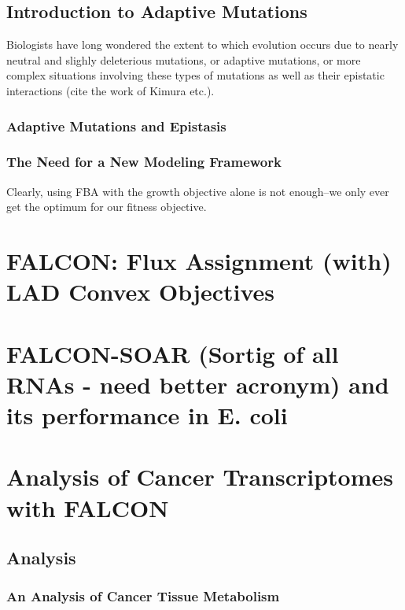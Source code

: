 \documentclass[phd,tocprelim]{cornell}
\newcommand*{\commonDir}{../common/}   %
\begin{document}
\section{Introduction to Adaptive Mutations}
Biologists have long wondered the extent to which evolution occurs due to nearly neutral 
and slighly deleterious mutations, or adaptive mutations, or more complex situations involving
these types of mutations as well as their epistatic interactions (cite the work of Kimura etc.).
 
\subsection{Adaptive Mutations and Epistasis}

\subsection{The Need for a New Modeling Framework}
Clearly, using FBA with the growth objective alone is not enough--we only ever get the 
optimum for our fitness objective.

\chapter{FALCON: Flux Assignment (with) LAD Convex Objectives}

\falconAbstractMotivation \falconAbstractResults


\chapter{FALCON-SOAR (Sortig of all RNAs - need better acronym) and its performance in E. coli} 


\chapter{Analysis of Cancer Transcriptomes with FALCON}

\section{Analysis}

\subsection{An Analysis of Cancer Tissue Metabolism}
\end{document}
